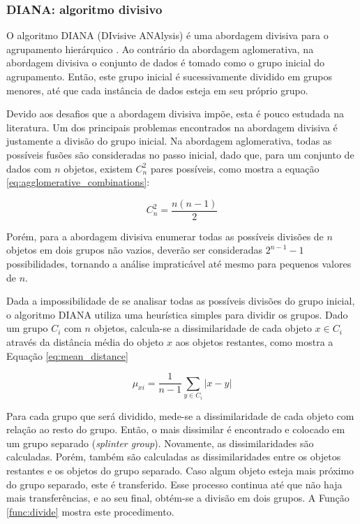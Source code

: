 \subsubsection{DIANA: algoritmo divisivo}
	\label{subsec:diana}

O algoritmo DIANA (DIvisive ANAlysis) é uma abordagem divisiva para o
agrupamento hierárquico \cite{kaufman1990finding}. Ao contrário da abordagem
aglomerativa, na abordagem divisiva o conjunto de dados é tomado como o grupo
inicial do agrupamento. Então, este grupo inicial é sucessivamente dividido em
grupos menores, até que cada instância de dados esteja em seu próprio grupo.

Devido aos desafios que a abordagem divisiva impõe, esta é pouco estudada na
literatura. Um dos principais problemas encontrados na abordagem divisiva é
justamente a divisão do grupo inicial. Na abordagem aglomerativa, todas as
possíveis fusões são consideradas no passo inicial, dado que, para um conjunto
de dados com $n$ objetos, existem $C_{n}^{2}$ pares possíveis, como mostra a
equação \ref{eq:agglomerative_combinations}:

\begin{equation}
	C_n^2 = \frac{n \left(n-1\right)}{2}
	\label{eq:agglomerative_combinations}
\end{equation}

Porém, para a abordagem divisiva enumerar todas as possíveis divisões de $n$
objetos em dois grupos não vazios, deverão ser consideradas $2^{n-1} - 1$
possibilidades, tornando a análise impraticável até mesmo para pequenos valores
de $n$.

Dada a impossibilidade de se analisar todas as possíveis divisões do grupo
inicial, o algoritmo DIANA utiliza uma heurística simples para dividir os
grupos. Dado um grupo $C_i$ com $n$ objetos, calcula-se a dissimilaridade de
cada objeto $x \in C_i$ através da distância média do objeto $x$ aos objetos
restantes, como mostra a Equação \ref{eq:mean_distance}

\begin{equation}
	\mu_{xi} = \frac{1}{n-1} \sum_{y \in C_i }{\left| x - y \right|}
	\label{eq:mean_distance}
\end{equation}

Para cada grupo que será dividido, mede-se a dissimilaridade de cada
objeto com relação ao resto do grupo. Então, o mais dissimilar é encontrado
e colocado em um grupo separado (\emph{splinter group}). Novamente, as
dissimilaridades são calculadas. Porém, também são calculadas as
dissimilaridades entre os objetos restantes e os objetos do grupo separado. Caso
algum objeto esteja mais próximo do grupo separado, este é transferido. Esse
processo continua até que não haja mais transferências, e ao seu final, obtém-se
a divisão em dois grupos. A Função \ref{func:divide} mostra este procedimento.

